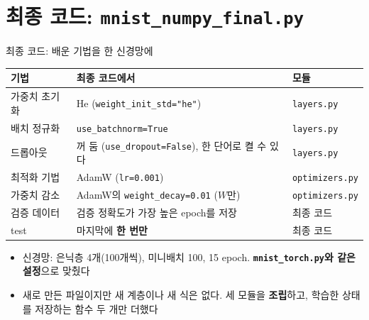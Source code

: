 \documentclass[aspectratio=169,11pt]{beamer}
\newcommand{\code}[1]{\texttt{#1}}
\begin{document}
\section{최종 코드: \texttt{mnist\_numpy\_final.py}}

\begin{frame}{최종 코드: 배운 기법을 한 신경망에}
\footnotesize
\centering
\small
\renewcommand{\arraystretch}{1.08}
\begin{tabular}{>{\raggedright}p{3.0cm}>{\raggedright}p{6.2cm}>{\raggedright\arraybackslash}p{3.0cm}}
\toprule
\textbf{기법} & \textbf{최종 코드에서} & \textbf{모듈} \\
\midrule
가중치 초기화 & He (\code{weight\_init\_std="he"}) & \code{layers.py} \\
배치 정규화 & \code{use\_batchnorm=True} & \code{layers.py} \\
드롭아웃 & 꺼 둠 (\code{use\_dropout=False}), 한 단어로 켤 수 있다 & \code{layers.py} \\
최적화 기법 & AdamW (\code{lr=0.001}) & \code{optimizers.py} \\
가중치 감소 & AdamW의 \code{weight\_decay=0.01} ($W$만) & \code{optimizers.py} \\
검증 데이터 & 검증 정확도가 가장 높은 epoch를 저장 & 최종 코드 \\
test & 마지막에 \textbf{한 번만} & 최종 코드 \\
\bottomrule
\end{tabular}
\vskip2mm
\raggedright
\begin{itemize}
\item 신경망: 은닉층 4개(100개씩), 미니배치 100, 15 epoch. \textbf{\code{mnist\_torch.py}와 같은 설정}으로 맞췄다
\item 새로 만든 파일이지만 새 계층이나 새 식은 없다. 세 모듈을 \textbf{조립}하고, 학습한 상태를 저장하는 함수 두 개만 더했다
\end{itemize}
\end{frame}
\end{document}
